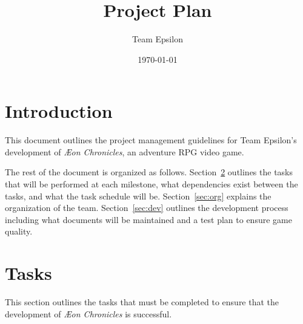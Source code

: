 \documentclass[12pt,titlepage]{article}
\title{Project Plan}
\author{Team Epsilon}
\date{\today}
\newcommand\gametitle{\textit{\AE on Chronicles}\xspace}
\begin{document}
\maketitle

\section{Introduction}

This document outlines the project management guidelines for Team Epsilon's
development of \gametitle, an adventure RPG video game.

The rest of the document is organized as follows. Section~\ref{sec:tasks}
outlines the tasks that will be performed at each milestone, what dependencies
exist between the tasks, and what the task schedule will be.
Section~\ref{sec:org} explains the organization of the team.
Section~\ref{sec:dev} outlines the development process including what documents
will be maintained and a test plan to ensure game quality.

\section{Tasks}
\label{sec:tasks}
This section outlines the tasks that must be completed to ensure that the
development of \gametitle is successful.
\end{document}

